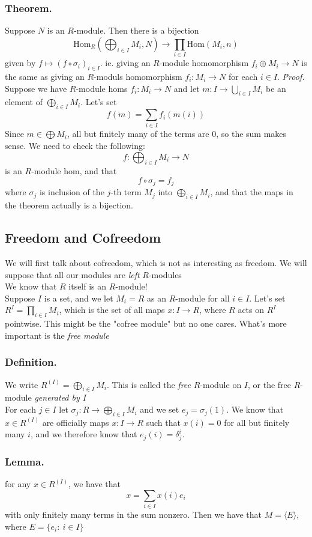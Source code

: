 \documentclass{article}
\newcommand{\vs}{\bigskip\\\text{}}
\newcommand{\beginproof}{\vspace{10pt}\newline\textit{Proof.}\hspace{1em}}
\begin{document}
\subsubsection{Theorem.} Suppose $N$ is an $R$-module. Then there is a bijection
\[ \text{Hom}_R\left(\bigoplus_{i\in I} M_i,N\right) \to \prod_{i\in I}\text{Hom}(M_i, n)\]
given by $f \mapsto (f\circ \sigma_i)_{i\in I}$. ie. giving an $R$-module
homomorphism $f_i \oplus M_i \to N$ is the same as giving an $R$-moduls
homomorphism $f_i: M_i \to N$ for each $i\in I$. \beginproof
Suppose we have $R$-module homs $f_i: M_i \to N$ and let $m: I \to \bigcup_{i\in
I} M_i$ be an element of $\bigoplus_{i\in I} M_i$. Let's set 
\[ f(m) = \sum_{i\in I}f_i(m(i))\]
Since $m \in \bigoplus M_i$, all but finitely many of the terms are $0$, so the
sum makes sense. We need to check the following:
\[ f: \bigoplus_{i\in I} M_i \to N\] is an $R$-module hom, and that 
\[ f\circ \sigma_j = f_j\]
where $\sigma_j$ is inclusion of the $j$-th term $M_j$ into $\bigoplus_{i\in
I}M_i$, and that the maps in the theorem actually is a bijection.\vs
%
\subsection{Freedom and Cofreedom} We will first talk about cofreedom, which is not
as interesting as freedom. We will suppose that all our modules are
\textit{left} $R$-modules\vs
We know that $R$ itself is an $R$-module!\vs
Suppose $I$ is a set, and we let $M_i = R$ as an $R$-module for all 
$i\in I$. Let's set $R^I = \prod_{i\in I} M_i$, which is the set of all maps
$x:I \to R$, where $R$ acts on $R^I$ pointwise. This might be the "cofree
module" but no one cares. What's more important is the \textit{free module}
\subsubsection{Definition.} We write $R^{(I)} = \bigoplus_{i\in I} M_i$. This is
called the \textit{free} $R$-module on $I$, or the free 
$R$-module \textit{generated by $I$}\vs
For each $j \in I$ let $\sigma_j: R\to \bigoplus_{i\in I} M_i$ and we set $e_j =
\sigma_j(1)$. We know that $x\in R^{(I)}$ are officially maps $x: I\to R$ such
that $x(i) = 0 $ for all but finitely many $i$, and we therefore know that
$e_j(i) = \delta^i_j$. 
\subsubsection{Lemma.} for any $x\in R^{(I)}$, we have that \[ x = \sum_{i\in I}
x(i) e_i\]
with only finitely many terms in the sum nonzero. Then we have that $M = \langle
E \rangle$, where $E =\{e_i: \: i\in I\}$
\end{document}
